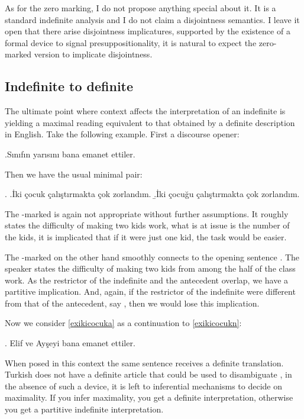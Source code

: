 \documentclass[11pt,a4paper]{article}
\begin{document}
As for the zero marking, I do not propose anything special about it.
It is a standard indefinite analysis and I do not claim a disjointness
semantics. I leave it open that there arise disjointness implicatures,
supported by the existence of a formal device to signal
presuppositionality, it is natural to expect the zero-marked version
to implicate disjointness. 


\subsection{Indefinite to definite}

The ultimate point where context affects the interpretation of an
indefinite is yielding a maximal reading equivalent to that obtained
by a definite description in English. Take the following example.
First a discourse opener:

\ex.\label{exikicocukw}Sınıfın yarısını bana emanet ettiler. 

Then we have the usual minimal pair:

\ex. 
\a.\label{exikicocukz}İki çocuk çalıştırmakta çok zorlandım.
\b.\label{exikicocuka}İki çocuğu çalıştırmakta çok zorlandım.


The \zero-marked  is again not appropriate without
further assumptions. It roughly states the difficulty of making two
kids work, what is at issue is the number of the kids, it is
implicated that if it were just one kid, the task would be easier.

The \acc-marked  on the other hand smoothly connects
to the opening sentence . The speaker states the
difficulty of making two kids from among the half of the class work.
As the restrictor of the indefinite and the antecedent overlap, we
have a partitive implication. And, again, if the restrictor of the
indefinite were different from that of the antecedent, say , then we would lose this implication. 

Now we consider \ref{exikicocuka} as a continuation to
\ref{exikicocukn}:

\ex.\label{exikicocukn} Elif ve Ayşeyi bana emanet ettiler. 

When posed in this context the same sentence receives a definite
translation. Turkish does not have a definite article that could be
used to disambiguate , in the absence of such a
device, it is left to inferential mechanisms to decide on maximality.
If you infer maximality, you get a definite interpretation, otherwise
you get a partitive indefinite interpretation. 
\end{document}
